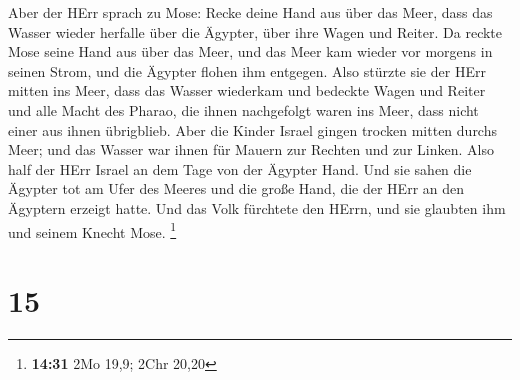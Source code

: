  Aber der HErr sprach zu Mose: Recke deine Hand aus über
das Meer, dass das Wasser wieder herfalle über die Ägypter, über ihre
Wagen und Reiter.  Da reckte Mose seine Hand aus über das
Meer, und das Meer kam wieder vor morgens in seinen Strom, und die
Ägypter flohen ihm entgegen. Also stürzte sie der HErr mitten ins Meer,
 dass das Wasser wiederkam und bedeckte Wagen und Reiter
und alle Macht des Pharao, die ihnen nachgefolgt waren ins Meer, dass
nicht einer aus ihnen übrigblieb.  Aber die Kinder Israel
gingen trocken mitten durchs Meer; und das Wasser war ihnen für Mauern
zur Rechten und zur Linken.  Also half der HErr Israel an
dem Tage von der Ägypter Hand. Und sie sahen die Ägypter tot am Ufer des
Meeres  und die große Hand, die der HErr an den Ägyptern
erzeigt hatte. Und das Volk fürchtete den HErrn, und sie glaubten ihm
und seinem Knecht Mose. \footnote{\textbf{14:31} 2Mo 19,9; 2Chr 20,20}

\hypertarget{section-3}{%
\section{15}\label{section-3}}

